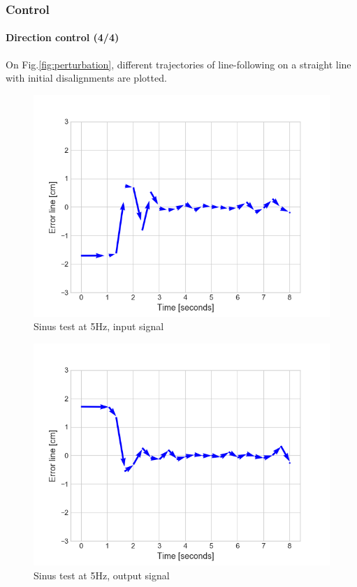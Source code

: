 \documentclass[10pt]{beamer}
\begin{document}

\begin{frame}
\frametitle{Control}
\framesubtitle{Direction control (4/4)}
On Fig.\ref{fig:perturbation}, different trajectories of line-following on a straight line with initial disalignments are plotted.
\begin{multicols}{2}
\begin{figure}
\centering
\includegraphics[scale=0.4]{figures/big-perturbation-left.png}
\caption{Sinus test at 5Hz, input signal}
\end{figure}
\columnbreak
\begin{figure}
\centering
\includegraphics[scale=0.4]{figures/big-perturbation-right.png}
\caption{Sinus test at 5Hz, output signal}
\end{figure}
\end{multicols}
\end{frame}
\end{document}
